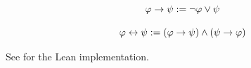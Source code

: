 \documentclass[../LogosReference.tex]{subfiles}
\begin{document}
\begin{definition}\label{def:material-conditional}
	\[
		\varphi \to \psi := \neg\varphi \lor \psi
	\]
\end{definition}

\begin{definition}[Biconditional]\label{def:biconditional}
	\[
		\varphi \leftrightarrow \psi := (\varphi \to \psi) \land (\psi \to \varphi)
	\]
\end{definition}

See  for the Lean implementation.
\end{document}
